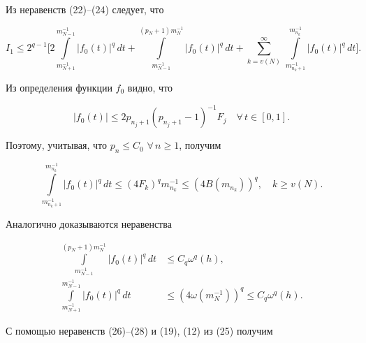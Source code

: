 \begin{pf}
\begin{equation}
\end{equation} 


Из неравенств (22)--(24) следует, что 


\begin{equation} 


I_1\le2^{q-1}\bigg[2 


\int\limits^{m^{-1}_{N-1}}_{m^{-1}_{N+1}}|f_0(t)|^q\,dt+ 


\int\limits^{(p_N+1)m^{-1}_N}_{m^{-1}_{N-1}}|f_0(t)|^q\,dt+ 


\sum^\infty_{k=v(N)}\, 


\int\limits^{m^{-1}_{n_k}}_{m^{-1}_{n_k+1}}|f_0(t)|^q\,dt\bigg]. 


\end{equation} 


Из определения функции $f_0$ видно, что 


$$ 


|f_0(t)|\le2p_{n_j+1}(p_{n_j+1}-1)^{-1}F_j\quad 


\forall\,t\in[0,1]. 


$$ 


Поэтому, учитывая, что $p_n\le C_0$ $\forall\,n\ge1$, получим 


\begin{equation} 


\int\limits^{m^{-1}_{n_k}}_{m^{-1}_{n_k+1}}|f_0(t)|^q\,dt\le 


(4F_k)^q m^{-1}_{n_k}\le(4B(m_{n_k}))^q,\quad 


k\ge v(N). 


\end{equation} 


Аналогично доказываются неравенства 


\begin{align} 


\int\limits^{(p_N+1)m^{-1}_N}_{m^{-1}_{N-1}}|f_0(t)|^q\,dt&\le 


C_q \omega^q(h),\\ 


% 


\int\limits^{m^{-1}_{N-1}}_{m^{-1}_{N+1}} 


|f_0(t)|^q\,dt&\le(4\omega(m^{-1}_N))^q\le 


C_q\omega^q(h). 


\end{align} 


С помощью неравенств (26)--(28) и (19), (12) из (25) получим 


\begin{equation} 



\end{equation}
\end{pf}
